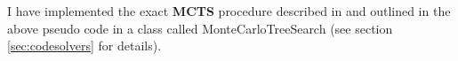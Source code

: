 I have implemented the exact \textbf{MCTS} procedure described in \cite{https://doi.org/10.48550/arxiv.1805.07470} and outlined in the above pseudo code in a class called MonteCarloTreeSearch (see section \ref{sec:codesolvers} for details).




































